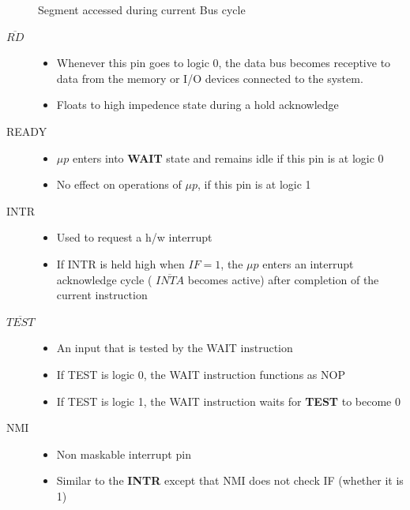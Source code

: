 \begin{description}
\begin{table}[h!]
  \caption{Segment accessed during current Bus cycle}
  \label{table:1}
  \end{table}

  \item[$\overline{RD}$]
  \begin{itemize}
      \item  Whenever this pin goes to logic 0, the data bus becomes receptive to data from the memory or I/O devices
          connected to the system.
      \item Floats to high impedence state during a hold acknowledge
  \end{itemize}

  \item[READY]
  \begin{itemize}
      \item $\mu p$ enters into \textbf{WAIT} state and remains idle if this pin is at logic 0
      \item No effect on operations of $\mu p$, if this pin is at logic 1
  \end{itemize}


  \item[INTR]
  \begin{itemize}
      \item  Used to request a h/w interrupt
      \item  If INTR is held high when $IF = 1$, the $\mu p$ enters an interrupt acknowledge cycle
      ( $\overline{INTA}$ becomes active) after completion of the current instruction
  \end{itemize}

  \item[$\overline{TEST}$]
  \begin{itemize}
      \item  An input that is tested by the WAIT instruction
      \item  If TEST is logic 0, the WAIT instruction functions as NOP
      \item If TEST is logic 1, the WAIT instruction waits for \textbf{TEST} to become 0
  \end{itemize}

 \item[NMI]
 \begin{itemize}
     \item Non maskable interrupt pin
     \item Similar to the \textbf{INTR} except that NMI does not check IF (whether it is 1)

 \end{itemize}

\end{description}
